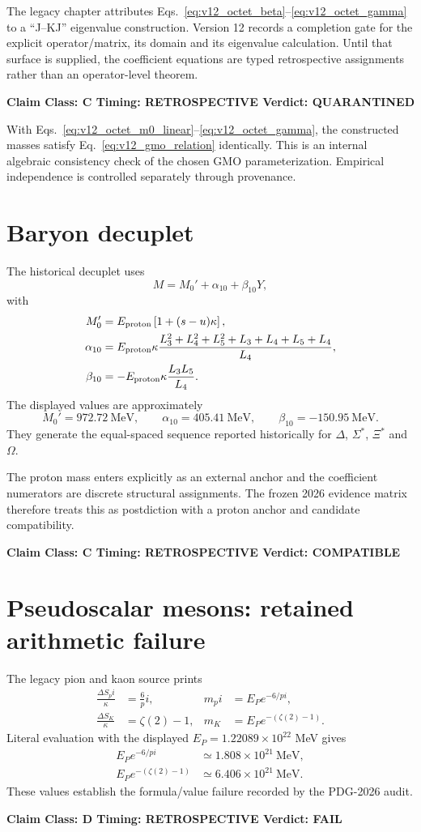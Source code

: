 \documentclass[11pt,a4paper,twoside]{book}
\def\pi{pi}%
\theoremstyle{definition}
\newcommand{\vTwelveStatus}[3]{\par\noindent\textbf{Claim Class: #1 \quad Timing: #2 \quad Verdict: #3}\par}
\begin{document}
The legacy chapter attributes Eqs.~\eqref{eq:v12_octet_beta}--\eqref{eq:v12_octet_gamma} to a ``J--KJ'' eigenvalue construction. Version 12 records a completion gate for the explicit operator/matrix, its domain and its eigenvalue calculation. Until that surface is supplied, the coefficient equations are typed retrospective assignments rather than an operator-level theorem.
\vTwelveStatus{C}{RETROSPECTIVE}{QUARANTINED}

With Eqs.~\eqref{eq:v12_octet_m0_linear}--\eqref{eq:v12_octet_gamma}, the constructed masses satisfy Eq.~\eqref{eq:v12_gmo_relation} identically. This is an internal algebraic consistency check of the chosen GMO parameterization. Empirical independence is controlled separately through provenance.

\section{Baryon decuplet}

The historical decuplet uses
\begin{equation}
M=M_0'+\alpha_{10}+\beta_{10}Y,
\label{eq:v12_decuplet}
\end{equation}
with
\begin{align}
M_0'&=E_{\rm proton}\left[1+(s-u)\kappa\right],\\
\alpha_{10}
&=E_{\rm proton}\kappa
\frac{L_3^2+L_4^2+L_5^2+L_3+L_4+L_5+L_4}{L_4},\\
\beta_{10}
&=-E_{\rm proton}\kappa\frac{L_3L_5}{L_4}.
\end{align}
The displayed values are approximately
\[
M_0'=972.72\ \mathrm{MeV},\qquad
\alpha_{10}=405.41\ \mathrm{MeV},\qquad
\beta_{10}=-150.95\ \mathrm{MeV}.
\]
They generate the equal-spaced sequence reported historically for $\Delta$, $\Sigma^*$, $\Xi^*$ and $\Omega$.

The proton mass enters explicitly as an external anchor and the coefficient numerators are discrete structural assignments. The frozen 2026 evidence matrix therefore treats this as postdiction with a proton anchor and candidate compatibility.
\vTwelveStatus{C}{RETROSPECTIVE}{COMPATIBLE}

\section{Pseudoscalar mesons: retained arithmetic failure}

The legacy pion and kaon source prints
\begin{align}
\frac{\Delta S_\pi}{\kappa}&=\frac6\pi,
& m_\pi&=E_Pe^{-6/\pi},\\
\frac{\Delta S_K}{\kappa}&=\zeta(2)-1,
& m_K&=E_Pe^{-(\zeta(2)-1)}.
\end{align}
Literal evaluation with the displayed $E_P=1.22089\times10^{22}$ MeV gives
\begin{align}
E_Pe^{-6/\pi}&\simeq1.808\times10^{21}\ \mathrm{MeV},\\
E_Pe^{-(\zeta(2)-1)}&\simeq6.406\times10^{21}\ \mathrm{MeV}.
\end{align}
These values establish the formula/value failure recorded by the PDG-2026 audit.
\vTwelveStatus{D}{RETROSPECTIVE}{FAIL}
\end{document}
